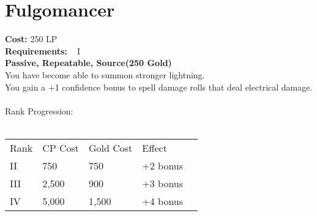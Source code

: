 \section{Fulgomancer}\label{perk:fulgomancer}
\textbf{Cost:} 250 LP\\
\textbf{Requirements:} ~ I\\
\textbf{Passive, Repeatable, Source(250 Gold)}\\
You have become able to summon stronger lightning.\\
You gain a +1 confidence bonus to spell damage rolls that deal electrical damage.\\
\\
Rank Progression:\\
\\
\begin{tabular}{l | l | l | l | l}
    Rank & CP Cost & Gold Cost &  Effect\\
    II & 750 & 750 & +2 bonus\\
    III & 2,500 & 900 & +3 bonus\\
    IV & 5,000 & 1,500 & +4 bonus\\
\end{tabular}